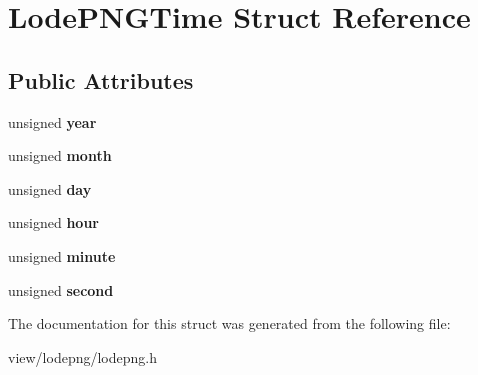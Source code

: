 \hypertarget{struct_lode_p_n_g_time}{\section{Lode\-P\-N\-G\-Time Struct Reference}
\label{struct_lode_p_n_g_time}
}
\subsection*{Public Attributes}
\begin{DoxyCompactItemize}
\item 
\hypertarget{struct_lode_p_n_g_time_a32b68342f39f3d38ba91a721b1149b8f}{unsigned {\bfseries year}}\label{struct_lode_p_n_g_time_a32b68342f39f3d38ba91a721b1149b8f}

\item 
\hypertarget{struct_lode_p_n_g_time_a295d890e862d5cd0c444e9d3a96fa9d5}{unsigned {\bfseries month}}\label{struct_lode_p_n_g_time_a295d890e862d5cd0c444e9d3a96fa9d5}

\item 
\hypertarget{struct_lode_p_n_g_time_aa3dee3b7b3a1e730fbded7a7b8cf355e}{unsigned {\bfseries day}}\label{struct_lode_p_n_g_time_aa3dee3b7b3a1e730fbded7a7b8cf355e}

\item 
\hypertarget{struct_lode_p_n_g_time_ac99cb7f3ce16a85f9f505b7f5f6e0aa7}{unsigned {\bfseries hour}}\label{struct_lode_p_n_g_time_ac99cb7f3ce16a85f9f505b7f5f6e0aa7}

\item 
\hypertarget{struct_lode_p_n_g_time_ac3045de79728f29fc61f534b062e0f13}{unsigned {\bfseries minute}}\label{struct_lode_p_n_g_time_ac3045de79728f29fc61f534b062e0f13}

\item 
\hypertarget{struct_lode_p_n_g_time_a6c691c5821e828488a8bb8a90751a2f0}{unsigned {\bfseries second}}\label{struct_lode_p_n_g_time_a6c691c5821e828488a8bb8a90751a2f0}

\end{DoxyCompactItemize}


The documentation for this struct was generated from the following file\-:\begin{DoxyCompactItemize}
\item 
view/lodepng/lodepng.\-h\end{DoxyCompactItemize}
